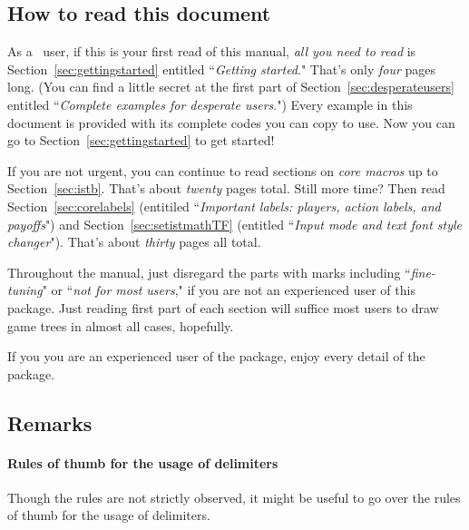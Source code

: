 \subsection{How to read this document}


As a \Tikz\ user, if this is your first read of this manual, \emph{all you need to read} is Section~\ref{sec:gettingstarted} entitled ``\emph{Getting started}."
That's only \emph{four} pages long. (You can find a little secret at the first part of Section~\ref{sec:desperateusers} entitled ``\emph{Complete examples for desperate users}.")
Every example in this document is provided with its complete codes you can copy to use.
Now you can go to Section~\ref{sec:gettingstarted} to get started!

If you are not urgent, you can continue to read sections on \emph{core macros} up to Section~\ref{sec:istb}. That's about \emph{twenty} pages total. Still more time? Then read Section~\ref{sec:corelabels} (entitiled ``\emph{Important labels: players, action labels, and payoffs}") and Section~\ref{sec:setistmathTF} (entitled ``\emph{Input mode and text font style changer}").
That's about \emph{thirty} pages all total.

Throughout the manual, just disregard the parts with marks including ``\emph{fine-tuning}" or ``\emph{not for most users}," if you are not an experienced user of this package. Just reading first part of each section will suffice most users to draw game trees in almost all cases, hopefully.

If you you are an experienced user of the  package, enjoy every detail of the package.

\subsection{Remarks}

\paragraph{Rules of thumb for the usage of delimiters}

Though the rules are not strictly observed, it might be useful to go over the rules of thumb for the usage of delimiters.

